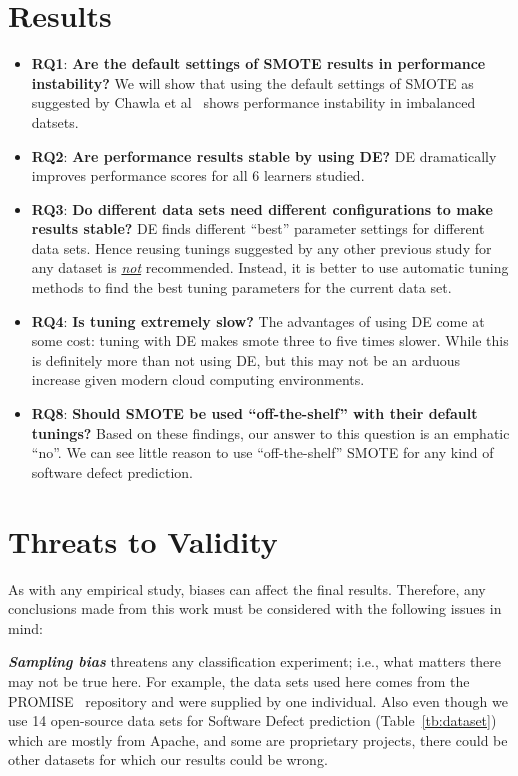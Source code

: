 \documentclass[conference]{IEEEtran}
\newcommand{\bi}{\begin{itemize}[leftmargin=0.4cm]}
\newcommand{\ei}{\end{itemize}}
\begin{document}
\section{Results}\label{sect:results}

\bi

\item \textbf{RQ1}: \textbf{Are the default settings of SMOTE results in performance instability?} We will show that using the default settings of SMOTE as suggested by Chawla et al~\cite{chawla2002smote} shows performance instability in imbalanced datsets.
    \item \textbf{RQ2}: \textbf{Are performance results stable by using DE?} DE dramatically improves performance scores for all 6 learners studied.
    \item \textbf{RQ3}: \textbf{Do different data sets
      need different configurations to make results stable?} DE finds different ``best'' parameter settings for different data sets. Hence reusing tunings  suggested  by  any other  previous study  for any dataset is \underline{{\em not}} recommended. Instead,  it is better to
      use  automatic  tuning  methods  to find the best tuning parameters for the current data set.
    \item \textbf{RQ4}: \textbf{Is tuning extremely slow?}
      The advantages of  using DE come at some cost:
      tuning with DE makes smote three to five times slower.
      While this is definitely more than not using DE, but this may not be an arduous increase
      given modern cloud computing environments. 
    \item \textbf{RQ8}: \textbf{Should SMOTE be used ``off-the-shelf'' with their default tunings?}
      Based on these findings, our answer to this question is an emphatic ``no''. We can see little reason to use ``off-the-shelf'' SMOTE for any kind of software defect prediction.
\ei

\section{Threats to Validity}
\label{validity}
As with any empirical study, biases can affect the final
results. Therefore, any conclusions made from this work must be considered with the following issues in mind:

\textbf{\textit{Sampling bias}} threatens any classification experiment; i.e., what matters there may not be true here. For example,
the data sets used here comes from the PROMISE~\cite{promiserepo} repository and were supplied by one individual. Also even though we use 14 open-source data sets for Software Defect prediction (Table~\ref{tb:dataset}) which are mostly from Apache, and some are proprietary projects, there could be other datasets for which our results could be wrong.
\end{document}
